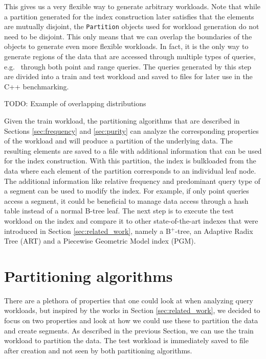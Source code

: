 This gives us a very flexible way to generate arbitrary workloads. Note that while a partition generated for the index construction later satisfies that the elements are mutually disjoint, the \verb|Partition| objects used for workload generation do not need to be disjoint. This only means that we can overlap the boundaries of the objects to generate even more flexible workloads. In fact, it is the only way to generate regions of the data that are accessed through multiple types of queries, e.g.~ through both point and range queries. The queries generated by this step are divided into a train and test workload and saved to files for later use in the C++ benchmarking.

TODO: Example of overlapping distributions

Given the train workload, the partitioning algorithms that are described in Sections \ref{sec:frequency} and \ref{sec:purity} can analyze the corresponding properties of the workload and will produce a partition of the underlying data. The resulting elements are saved to a file with additional information that can be used for the index construction.
With this partition, the index is bulkloaded from the data where each element of the partition corresponds to an individual leaf node. The additional information like relative frequency and predominant query type of a segment can be used to modify the index. For example, if only point queries access a segment, it could be beneficial to manage data access through a hash table instead of a normal B-tree leaf. The next step is to execute the test workload on the index and compare it to other state-of-the-art indexes that were introduced in Section \ref{sec:related_work}, namely a B$^+$-tree, an Adaptive Radix Tree (ART) and a Piecewise Geometric Model index (PGM).

\section{Partitioning algorithms}
There are a plethora of properties that one could look at when analyzing query workloads, but inspired by the works in Section \ref{sec:related_work}, we decided to focus on two properties and look at how we could use these to partition the data and create segments. As described in the previous Section, we can use the train workload to partition the data. The test workload is immediately saved to file after creation and not seen by both partitioning algorithms. 

